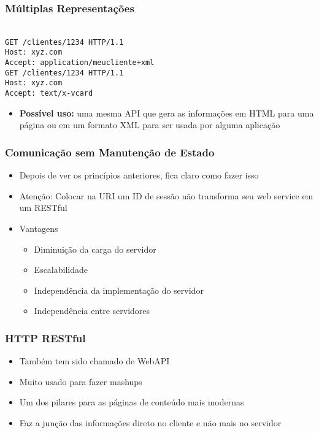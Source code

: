 \documentclass[Ligatures=TeX,table,brazil,svgnames,usetotalslideindicator,comp
ress,10pt]{beamer}
\begin{document}
\begin{frame}
  \frametitle{Múltiplas Representações}

  \texttt{\mbox{}\\
    GET /clientes/1234 HTTP/1.1\\
    Host: xyz.com\\
    Accept: application/meucliente+xml\\
    GET /clientes/1234 HTTP/1.1\\
    Host: xyz.com\\
    Accept: text/x-vcard\\
  }

  \begin{itemize}
  \item \textbf{Possível uso:} uma mesma API que gera as informações em HTML
    para uma página ou em um formato XML para ser usada por alguma
    aplicação
  \end{itemize}
\end{frame}


\begin{frame}
  \frametitle{Comunicação sem Manutenção de Estado}

  \begin{itemize}
  \item Depois de ver os princípios anteriores, fica claro como fazer isso
  \item Atenção: Colocar na URI um ID de sessão não transforma seu web service em um RESTful
  \item Vantagens
    \begin{itemize}
    \item Diminuição da carga do servidor
    \item Escalabilidade
    \item Independência da implementação do servidor
    \item Independência entre servidores
    \end{itemize}
  \end{itemize}

\end{frame}

\begin{frame}
  \frametitle{HTTP RESTful}
  \begin{itemize}
  \item Também tem sido chamado de WebAPI
  \item Muito usado para fazer mashups
  \item Um dos pilares para as páginas de conteúdo mais modernas
  \item Faz a junção das informações direto no cliente e não mais no servidor
  \end{itemize}
\end{frame}
\end{document}
